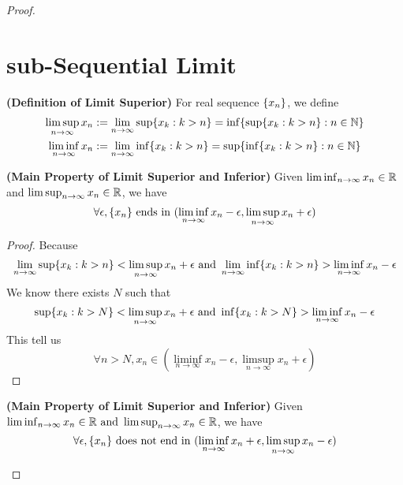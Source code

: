 \documentclass{report}
\begin{document}
\begin{proof}
\section{sub-Sequential Limit}
\begin{definition}
\label{4.3.1}
\textbf{(Definition of Limit Superior)} For real sequence $\{ x_n \}$, we define
\begin{align}
  \limsup_{n\to\infty} x_n&:=\lim_{n\to\infty} \sup \{ x_k:k>n \}=\inf \{ \sup \{ x_k:k>n \}:n\in\mathbb{N} \}\\
  \liminf_{n\to\infty} x_n&:=\lim_{n\to\infty}\inf \{ x_k:k>n \}=\sup \{ \inf \{ x_k:k>n \}:n\in\mathbb{N} \}
\end{align}
\end{definition}
\begin{theorem}
\label{4.3.2}
\textbf{(Main Property of Limit Superior and Inferior)} 
Given $\liminf_{n\to\infty} x_n\in\mathbb{R}$ and $\limsup_{n\to\infty} x_n\in\mathbb{R}$, we have
\begin{gather}
\forall \epsilon ,\{ x_n \}\text{ ends in }(\liminf_{n\to\infty} x_n-\epsilon ,\limsup_{n\to\infty} x_n+\epsilon )
\end{gather}
\end{theorem}
\begin{proof}
Because 
\begin{equation}
\lim_{n\to\infty}\sup  \{ x_k:k>n \}<\limsup_{n\to\infty} x_n+\epsilon \text{ and }\lim_{n\to\infty}\inf \{ x_k:k>n \}>\liminf_{n\to\infty} x_n-\epsilon 
\end{equation}
We know there exists $N$ such that 
 \begin{equation}
\sup \{ x_k:k>N \}<\limsup_{n\to\infty} x_n+\epsilon \text{ and }\inf \{ x_k:k>N \}>\liminf_{n\to\infty} x_n-\epsilon 
\end{equation}
This tell us
\begin{equation}
\forall n>N, x_n\in (\liminf_{n\to\infty} x_n-\epsilon ,\limsup_{n\to\infty} x_n+\epsilon )
\end{equation}
\end{proof}
\begin{theorem}
\label{4.3.3}
\textbf{(Main Property of Limit Superior and Inferior)} 
Given $\liminf_{n\to\infty} x_n\in\mathbb{R}\text{ and }\limsup_{n\to\infty} x_n\in\mathbb{R}$, we have
\begin{equation}
\forall \epsilon , \set{x_n}\text{ does not end in }(\liminf_{n\to\infty} x_n+\epsilon ,\limsup_{n\to\infty} x_n-\epsilon )

\end{equation}
\end{theorem}
\end{proof}
\end{document}
